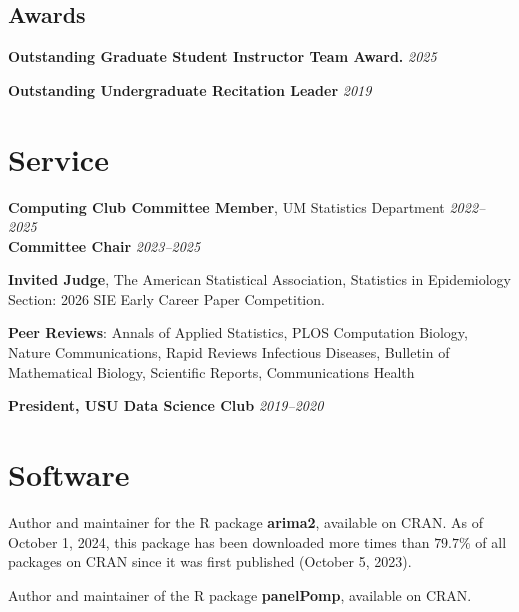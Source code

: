 \documentclass[11pt]{article}
\begin{document}
\subsection*{Awards}

\noindent\hspace{5mm}\textbf{Outstanding Graduate Student Instructor Team Award.} \hfill {\textit{2025}}

\noindent\hspace{5mm}\textbf{Outstanding Undergraduate Recitation Leader} \hfill  {\textit{2019}}

\noindent\hspace{10mm}{\it USU Mathematics and Statistics Department}

\section*{Service}

\noindent \textbf{Computing Club Committee Member}, UM Statistics Department \hfill  {\textit{2022--2025}}\\
\noindent \textbf{Committee Chair} \hfill {\it 2023--2025}

\vspace{2mm}

\noindent \textbf{Invited Judge}, The American Statistical Association, Statistics in Epidemiology Section: 2026 SIE Early Career Paper Competition.

\vspace{2mm}
\noindent \textbf{Peer Reviews}: Annals of Applied Statistics, PLOS Computation Biology, Nature Communications, Rapid Reviews Infectious Diseases, Bulletin of Mathematical Biology, Scientific Reports, Communications Health

\vspace{2mm}
\noindent \textbf{President, USU Data Science Club} \hfill  {\textit{2019--2020}}

\section*{Software}

\noindent Author and maintainer for the R package \textbf{arima2}, available on CRAN. As of October 1, 2024, this package has been downloaded more times than $79.7\%$ of all packages on CRAN since it was first published (October 5, 2023).

\vspace{2mm}
\noindent Author and maintainer of the R package \textbf{panelPomp}, available on CRAN.
\end{document}
